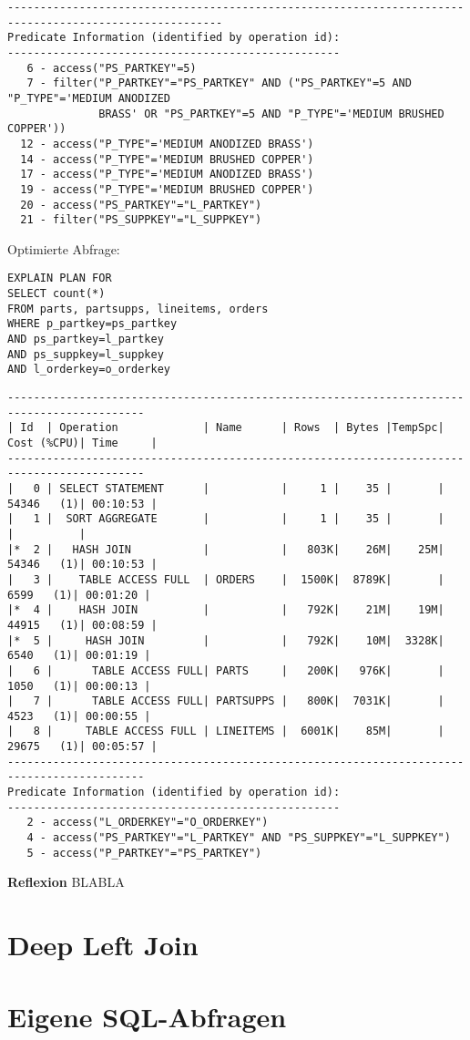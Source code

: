 \documentclass[10pt]{article}
\begin{document}
\begin{lstlisting}[style=queryexecutionplan]
-------------------------------------------------------------------------------------------------------
Predicate Information (identified by operation id):
---------------------------------------------------
   6 - access("PS_PARTKEY"=5)
   7 - filter("P_PARTKEY"="PS_PARTKEY" AND ("PS_PARTKEY"=5 AND "P_TYPE"='MEDIUM ANODIZED 
              BRASS' OR "PS_PARTKEY"=5 AND "P_TYPE"='MEDIUM BRUSHED COPPER'))
  12 - access("P_TYPE"='MEDIUM ANODIZED BRASS')
  14 - access("P_TYPE"='MEDIUM BRUSHED COPPER')
  17 - access("P_TYPE"='MEDIUM ANODIZED BRASS')
  19 - access("P_TYPE"='MEDIUM BRUSHED COPPER')
  20 - access("PS_PARTKEY"="L_PARTKEY")
  21 - filter("PS_SUPPKEY"="L_SUPPKEY")
\end{lstlisting}

Optimierte Abfrage:
\begin{lstlisting}[style=sql]
EXPLAIN PLAN FOR
SELECT count(*)
FROM parts, partsupps, lineitems, orders
WHERE p_partkey=ps_partkey
AND ps_partkey=l_partkey
AND ps_suppkey=l_suppkey
AND l_orderkey=o_orderkey
\end{lstlisting}
\begin{lstlisting}[style=queryexecutionplan]
-------------------------------------------------------------------------------------------
| Id  | Operation             | Name      | Rows  | Bytes |TempSpc| Cost (%CPU)| Time     |
-------------------------------------------------------------------------------------------
|   0 | SELECT STATEMENT      |           |     1 |    35 |       | 54346   (1)| 00:10:53 |
|   1 |  SORT AGGREGATE       |           |     1 |    35 |       |            |          |
|*  2 |   HASH JOIN           |           |   803K|    26M|    25M| 54346   (1)| 00:10:53 |
|   3 |    TABLE ACCESS FULL  | ORDERS    |  1500K|  8789K|       |  6599   (1)| 00:01:20 |
|*  4 |    HASH JOIN          |           |   792K|    21M|    19M| 44915   (1)| 00:08:59 |
|*  5 |     HASH JOIN         |           |   792K|    10M|  3328K|  6540   (1)| 00:01:19 |
|   6 |      TABLE ACCESS FULL| PARTS     |   200K|   976K|       |  1050   (1)| 00:00:13 |
|   7 |      TABLE ACCESS FULL| PARTSUPPS |   800K|  7031K|       |  4523   (1)| 00:00:55 |
|   8 |     TABLE ACCESS FULL | LINEITEMS |  6001K|    85M|       | 29675   (1)| 00:05:57 |
-------------------------------------------------------------------------------------------
Predicate Information (identified by operation id):
---------------------------------------------------
   2 - access("L_ORDERKEY"="O_ORDERKEY")
   4 - access("PS_PARTKEY"="L_PARTKEY" AND "PS_SUPPKEY"="L_SUPPKEY")
   5 - access("P_PARTKEY"="PS_PARTKEY")
\end{lstlisting}
\textbf{Reflexion} \newline
BLABLA

\section{Deep Left Join}

\section{Eigene SQL-Abfragen}

\end{document}
